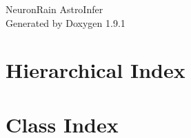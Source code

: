 \let\mypdfximage\pdfximage\def\pdfximage{\immediate\mypdfximage}\documentclass[twoside]{book}
\newcommand{\+}{\discretionary{\mbox{\scriptsize$\hookleftarrow$}}{}{}}
\newcommand{\clearemptydoublepage}{%
  \newpage{\pagestyle{empty}\cleardoublepage}%
}
\begin{document}
\raggedbottom

\hypersetup{pageanchor=false,
             bookmarksnumbered=true,
             pdfencoding=unicode
            }
\begin{titlepage}
\vspace*{7cm}
\begin{center}%
{\Large Neuron\+Rain Astro\+Infer }\\
\vspace*{1cm}
{\large Generated by Doxygen 1.9.1}\\
\end{center}
\end{titlepage}
\clearemptydoublepage
{}
\tableofcontents
\clearemptydoublepage
{}
\hypersetup{pageanchor=true}

\chapter{Hierarchical Index}

\chapter{Class Index}

\end{document}
